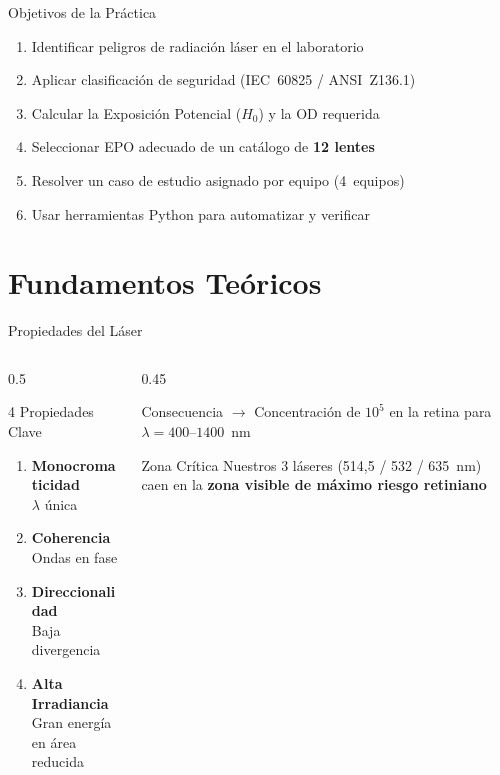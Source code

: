 \documentclass[aspectratio=169,12pt]{beamer}
\begin{document}
\begin{frame}{Objetivos de la Práctica}
	\begin{enumerate}
		\item Identificar peligros de radiación láser en el laboratorio
		\item Aplicar clasificación de seguridad (IEC~60825 / ANSI~Z136.1)
		\item Calcular la Exposición Potencial ($H_0$) y la OD requerida
		\item Seleccionar EPO adecuado de un catálogo de \textbf{12 lentes}
		\item Resolver un caso de estudio asignado por equipo (4~equipos)
		\item Usar herramientas Python para automatizar y verificar
	\end{enumerate}
\end{frame}

\section{Fundamentos Teóricos}

\begin{frame}{Propiedades del Láser}
	\begin{columns}
		\begin{column}{0.5\textwidth}
			\begin{block}{4 Propiedades Clave}
				\begin{enumerate}
					\item \textbf{Monocromaticidad} \\ $\lambda$ única
					\item \textbf{Coherencia} \\ Ondas en fase
					\item \textbf{Direccionalidad} \\ Baja divergencia
					\item \textbf{Alta Irradiancia} \\ Gran energía en área reducida
				\end{enumerate}
			\end{block}
		\end{column}
		\begin{column}{0.45\textwidth}
			\begin{alertblock}{Consecuencia}
				$\rightarrow$ Concentración de $10^5$ en la retina para $\lambda = 400$--$1400$~nm
			\end{alertblock}
			\vspace{0.3cm}
			\begin{exampleblock}{Zona Crítica}
				Nuestros 3 láseres (514,5 / 532 / 635~nm) caen en la \textbf{zona visible de máximo riesgo retiniano}
			\end{exampleblock}
		\end{column}
	\end{columns}
\end{frame}
\end{document}
